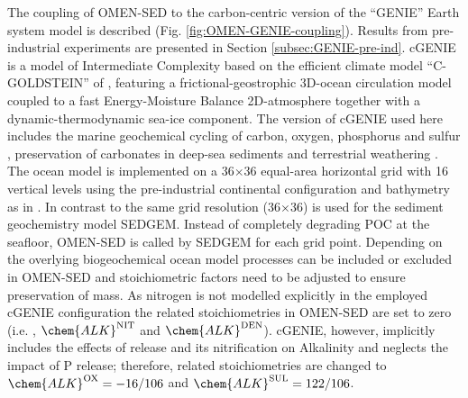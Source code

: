 \documentclass[gmd, manuscript]{copernicus}
\begin{document}
The coupling of OMEN-SED to the carbon-centric version of the ``GENIE'' Earth system model \citep[cGENIE][]{ridgwell_marine_2007} is described  (Fig. \ref{fig:OMEN-GENIE-coupling}). 
Results from pre-industrial experiments are presented in Section \ref{subsec:GENIE-pre-ind}. 
cGENIE is a model of Intermediate Complexity based on the efficient climate model ``C-GOLDSTEIN''  of \citet{edwards_uncertainties_2005}, featuring a frictional-geostrophic 3D-ocean circulation model coupled to a fast 
Energy-Moisture Balance 2D-atmosphere together with a dynamic-thermodynamic sea-ice component. 
The version of cGENIE used here includes the marine geochemical cycling of carbon, oxygen, phosphorus and sulfur \citep{ridgwell_marine_2007}, 
preservation of carbonates in deep-sea sediments \citep{ridgwell_regulation_2007} and terrestrial weathering \citep{colbourn_rock_2013}. 
The ocean model is implemented on a 36$\times$36 equal-area horizontal grid with 16 vertical levels using the pre-industrial continental configuration and bathymetry as in \citet{archer_atmospheric_2009}. 
In contrast to \citet{archer_atmospheric_2009} the same grid resolution (36$\times$36) is used for the sediment geochemistry model SEDGEM. 
Instead of completely degrading POC at the seafloor, OMEN-SED is called by SEDGEM for each grid point. 
Depending on the overlying biogeochemical ocean model processes can be included or excluded in OMEN-SED and stoichiometric factors need to be adjusted to ensure preservation of mass. 
As nitrogen is not modelled explicitly in the employed cGENIE configuration the related stoichiometries in OMEN-SED are set to zero (i.e. , $\chem{ALK}^\mathrm{NIT}$ and $\chem{ALK}^\mathrm{DEN}$). 
cGENIE, however, implicitly includes the effects of  release and its nitrification on Alkalinity and neglects the impact of P release; therefore, related 
stoichiometries are changed to $\chem{ALK}^\mathrm{OX} = -16/106$ and $\chem{ALK}^\mathrm{SUL} = 122/106$.
\end{document}
